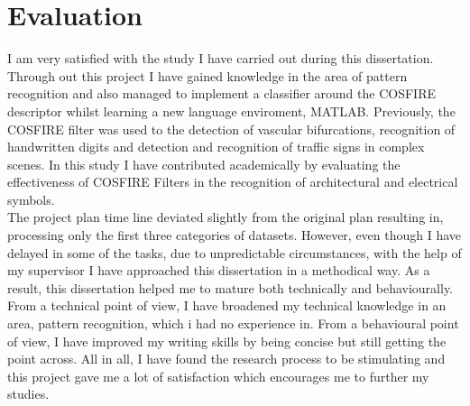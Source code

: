 \chapter{Evaluation}

I am very satisfied with the study I have carried out during this dissertation. Through out this project I have gained knowledge in the area of pattern recognition and also managed to implement a classifier around the COSFIRE descriptor whilst learning a new language enviroment, MATLAB. Previously, the COSFIRE filter was used to the detection of vascular bifurcations, recognition of handwritten digits and detection and recognition of traffic signs in complex scenes. In this study I have contributed academically by evaluating the effectiveness of COSFIRE Filters in the recognition of architectural and electrical symbols. \\

The project plan time line deviated slightly from the original plan resulting in, processing only the first three categories of datasets. However, even though I have delayed in some of the tasks, due to unpredictable circumstances, with the help of my supervisor I have approached this dissertation in a methodical way. As a result, this dissertation helped me to mature both technically and behaviourally. \\

From a technical point of view, I have broadened my technical knowledge in an area, pattern recognition, which i had no experience in. From a behavioural point of view, I have improved my writing skills by being concise but still getting the point across. All in all, I have found the research process to be stimulating and this project gave me a lot of satisfaction which encourages me to further my studies.